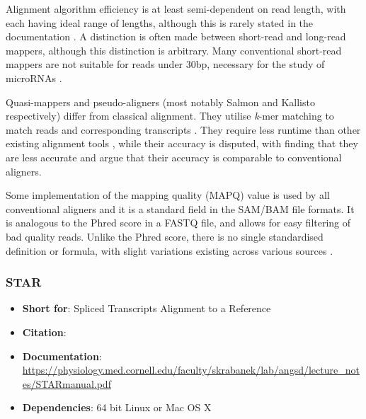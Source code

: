 Alignment algorithm efficiency is at least semi-dependent on read length, with each having ideal range of lengths, although this is rarely stated in the documentation \citep{albert2020biostar}. A distinction is often made between short-read and long-read mappers, although this distinction is arbitrary. Many conventional short-read mappers are not suitable for reads under 30bp, necessary for the study of microRNAs \citep{albert2020biostar, ziemann2016evaluation}.

Quasi-mappers and pseudo-aligners (most notably Salmon \citep{patro2017salmon} and Kallisto \citep{bray2016near} respectively) differ from classical alignment. They utilise \textit{k}-mer matching to match reads and corresponding transcripts \citep{rnadataanalysis2020}. They require less runtime than other existing alignment tools \citep{Zhang2017}, while their accuracy is disputed, with \cite{srivastava2020alignment} finding that they are less accurate and \cite{Zhang2017, Schaarschmidt2020} argue that their accuracy is comparable to conventional aligners.

Some implementation of the mapping quality (MAPQ) value is used by all conventional aligners and it is a standard field in the SAM/BAM file formats. It is analogous to the Phred score in a FASTQ file, and allows for easy filtering of bad quality reads. Unlike the Phred score, there is no single standardised definition or formula, with slight variations existing across various sources \citep{andrews2016mapq}.


\subsubsection{STAR}
\begin{itemize}\itemsep-0.5em
\item[] \textbf{Short for}: 				Spliced Transcripts Alignment to a Reference
\item[] \textbf{Citation}: 				\cite{Dobin2013}
\item[] \textbf{Documentation}: 	\url{https://physiology.med.cornell.edu/faculty/skrabanek/lab/angsd/lecture_notes/STARmanual.pdf}
\item[] \textbf{Dependencies}: 64 bit Linux or Mac OS X
\end{itemize}

